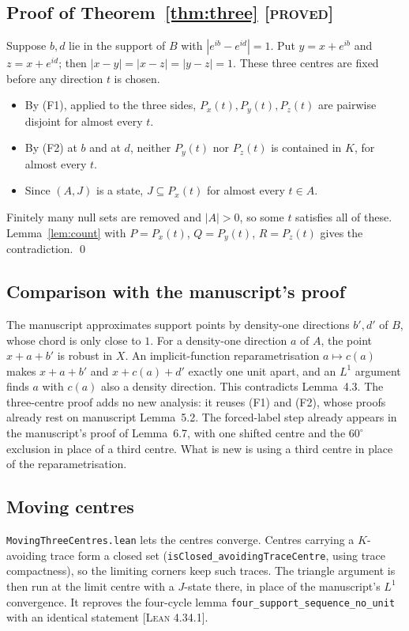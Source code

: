 \documentclass[11pt]{article}
\theoremstyle{definition}
\theoremstyle{remark}
\newcommand{\st}[1]{\textsc{[#1]}}
\begin{document}
\subsection{Proof of Theorem~\ref{thm:three} \st{proved}}
Suppose $b,d$ lie in the support of $B$ with $|e^{ib}-e^{id}|=1$. Put $y=x+e^{ib}$ and $z=x+e^{id}$; then $|x-y|=|x-z|=|y-z|=1$. These three centres are fixed before any direction $t$ is chosen.
\begin{itemize}
\item By (F1), applied to the three sides, $P_x(t),P_y(t),P_z(t)$ are pairwise disjoint for almost every $t$.
\item By (F2) at $b$ and at $d$, neither $P_y(t)$ nor $P_z(t)$ is contained in $K$, for almost every $t$.
\item Since $(A,J)$ is a state, $J\subseteq P_x(t)$ for almost every $t\in A$.
\end{itemize}
Finitely many null sets are removed and $|A|>0$, so some $t$ satisfies all of these. Lemma~\ref{lem:count} with $P=P_x(t)$, $Q=P_y(t)$, $R=P_z(t)$ gives the contradiction. \qed

\subsection{Comparison with the manuscript's proof}
The manuscript approximates support points by density-one directions $b',d'$ of $B$, whose chord is only close to $1$. For a density-one direction $a$ of $A$, the point $x+a+b'$ is robust in $X$. An implicit-function reparametrisation $a\mapsto c(a)$ makes $x+a+b'$ and $x+c(a)+d'$ exactly one unit apart, and an $L^1$ argument finds $a$ with $c(a)$ also a density direction. This contradicts Lemma~4.3. The three-centre proof adds no new analysis: it reuses (F1) and (F2), whose proofs already rest on manuscript Lemma~5.2. The forced-label step already appears in the manuscript's proof of Lemma~6.7, with one shifted centre and the $60^\circ$ exclusion in place of a third centre. What is new is using a third centre in place of the reparametrisation.

\subsection{Moving centres}
\texttt{Moving\allowbreak{}Three\allowbreak{}Centres.\allowbreak{}lean} lets the centres converge. Centres carrying a $K$-avoiding trace form a closed set (\texttt{is\allowbreak{}Closed\_\allowbreak{}avoiding\allowbreak{}Trace\allowbreak{}Centre}, using trace compactness), so the limiting corners keep such traces. The triangle argument is then run at the limit centre with a $J$-state there, in place of the manuscript's $L^1$ convergence. It reproves the four-cycle lemma \texttt{four\_\allowbreak{}support\_\allowbreak{}sequence\_\allowbreak{}no\_\allowbreak{}unit} with an identical statement \st{Lean 4.34.1}.
\end{document}
